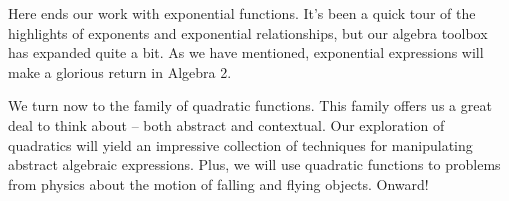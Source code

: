 \chaptersummary

Here ends our work with exponential functions. It's been a quick tour of the highlights of exponents and exponential relationships, but our algebra toolbox has expanded quite a bit. As we have mentioned, exponential expressions will make a glorious return in Algebra 2.

We turn now to the family of quadratic functions. This family offers us a great deal to think about -- both abstract and contextual. Our exploration of quadratics will yield an impressive collection of techniques for manipulating abstract algebraic expressions. Plus, we will use quadratic functions to problems from physics about the motion of falling and flying objects. Onward!

\chaptercopyright
